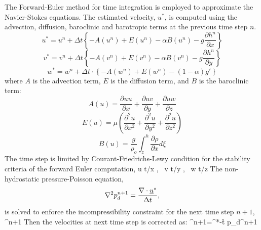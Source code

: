 The Forward-Euler method for time integration is employed to
approximate the Navier-Stokes equations. The estimated velocity, $u^{*}$,
is computed using the advection, diffusion, baroclinic and barotropic terms at the previous time step $n$.
\begin {equation}
u^{*} = u^{n}+ \Delta t  \left\{
-A(u^n)+E(u^n)-\alpha B(u^n)-g\frac{\partial h^n}{\partial
x}%
\right\}
\end{equation}
\begin {equation}
v^{*} = v^{n}+ \Delta t  \left\{
-A(v^n)+E(v^n)-\alpha B(v^n)-g\frac{\partial h^n}{\partial
y}%
\right\}
\end{equation}
\begin {equation}
w^{*} = w^{n}+ \Delta t \cdot \left\{ -A(w^n)+E(w^n) - (1-\alpha)g' \right\}
\end{equation}
where $A$ is the advection term, $E$ is the diffusion term, and $B$ is
the baroclinic term:
\begin{equation}
A(u)=\frac {\partial uu}{\partial x}+ \frac {\partial
uv}{\partial y}+ \frac {\partial uw}{\partial z}
\end{equation}
\begin{equation}
E(u)=\mu (\frac {\partial^2 u}{\partial x^2}+\frac
{\partial^2 u}{\partial y^2}+\frac {\partial^2 u}{\partial z^2})
\end{equation}
\begin{equation}
B(u)=\frac{g}{\rho_o}\int_z^h \frac{\partial \rho}{\partial x} d
\xi
\end{equation}
The time step is limited by Courant-Friedrichs-Lewy condition for the stability criteria of the forward Euler computation,
\be
u \Delta t/\Delta x , \ v \Delta t/\Delta y , \ w \Delta t/\Delta z 
\ee
The non-hydrostatic pressure-Poisson equation,
\begin{equation}
\nabla^2 p_d^{n+1} = \frac {\nabla \cdot
\+{u}^*}{\Delta t},
\label{eqn:pressure-poisson-const-den}
\end{equation}
is solved to enforce the incompressibility constraint for the next time step
$n+1$,
\be
\n \cdot {}^{n+1}
\ee
Then the velocities at next time step is corrected as:
\be
{}^{n+1}=^*-\f{\Delta t}{\rho} \n p_d^{n+1}
\ee

